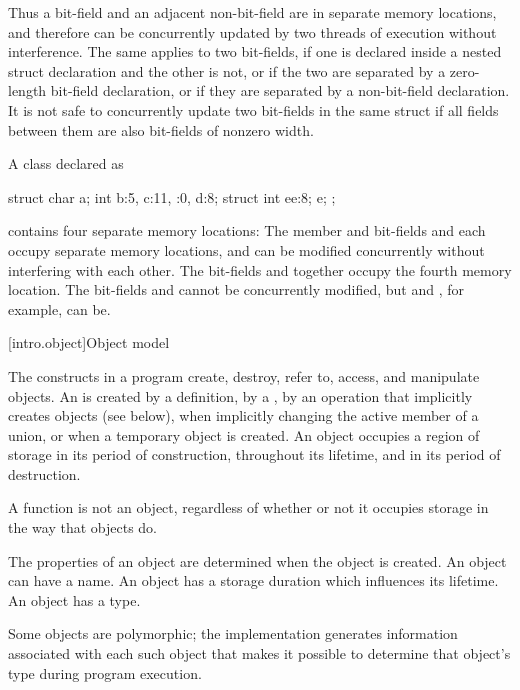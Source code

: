 \pnum
\begin{note}
Thus a bit-field and an adjacent non-bit-field are in separate memory
locations, and therefore can be concurrently updated by two threads of execution
without interference. The same applies to two bit-fields, if one is declared
inside a nested struct declaration and the other is not, or if the two are
separated by a zero-length bit-field declaration, or if they are separated by a
non-bit-field declaration. It is not safe to concurrently update two bit-fields
in the same struct if all fields between them are also bit-fields of nonzero
width.
\end{note}

\pnum
\begin{example}
A class declared as
\begin{codeblock}
struct {
  char a;
  int b:5,
  c:11,
  :0,
  d:8;
  struct {int ee:8;} e;
};
\end{codeblock}
contains four separate memory locations: The member  and bit-fields
 and  each occupy separate memory locations, and can be
modified concurrently without interfering with each other. The bit-fields
 and  together occupy the fourth memory location. The
bit-fields  and  cannot be concurrently modified, but
 and , for example, can be.
\end{example}

[intro.object]{Object model}

\pnum
{}%
The constructs in a \Cpp{} program create, destroy, refer to, access, and
manipulate objects.
An  is created
by a definition,
by a ,
by an operation that implicitly creates objects (see below),
when implicitly changing the active member of a union,
or
when a temporary object is created.
An object occupies a region of storage
in its period of construction,
throughout its lifetime,
and
in its period of destruction.
\begin{note}
A function is not an object, regardless of whether or not it
occupies storage in the way that objects do.
\end{note}
The properties of an
object are determined when the object is created. An object can have a
name. An object has a storage
duration which influences its
lifetime. An object has a
type.
\begin{note}
Some objects are
polymorphic; the implementation
generates information associated with each such object that makes it
possible to determine that object's type during program execution.
\end{note}

